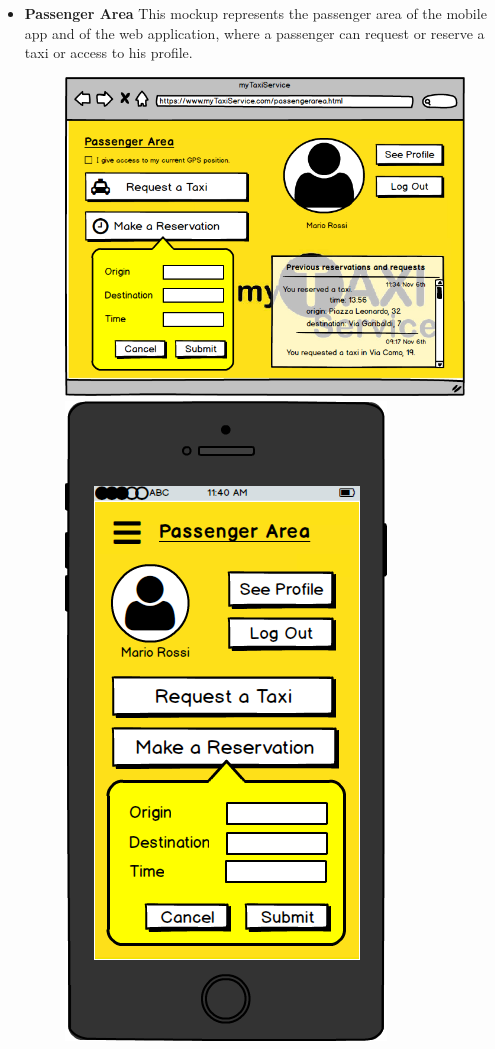\documentclass[18pt,oneside,a4paper, titlepage]{article}
\begin{document}
\begin{itemize}
\begin{figure}[h]
				\end{figure}
				\\ 	\\
				\item \textbf{Passenger Area} This mockup represents the passenger area of the mobile app and of the web application, where a passenger can request or reserve a taxi or access to his profile.\\
				\begin{figure}[h]
					\includegraphics[scale=0.3]{WebAppMakeAReservation.png}%
					\qquad\qquad
					\includegraphics[scale=0.3]{MobileAppMakeAReservation.png}

\end{figure}
\end{itemize}
\end{document}
